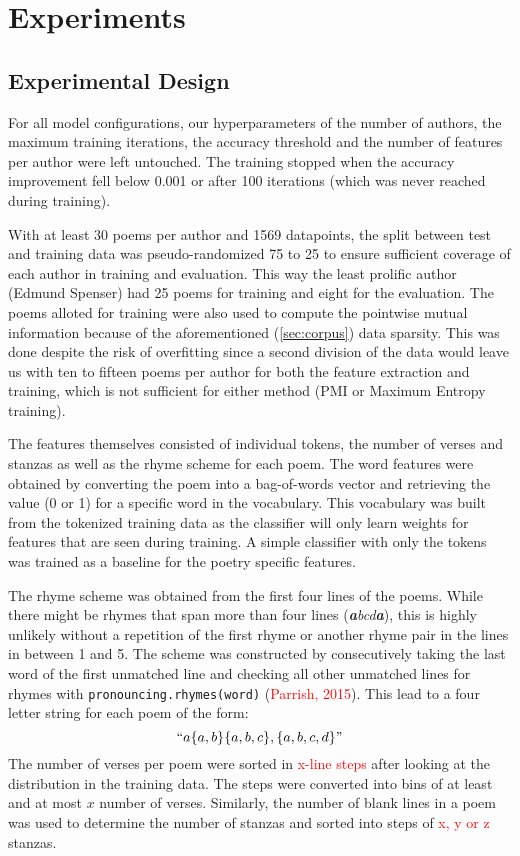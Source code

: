 \documentclass[11pt]{article}
\begin{document}
\label{sec:corpus}

\section{Experiments}

\subsection{Experimental Design}

For all model configurations, our hyperparameters of the number of authors, the maximum training 
iterations, the accuracy threshold and the number of features per author were left untouched. The training stopped when the accuracy
improvement fell below  0.001 or after 100 iterations (which was never reached during training).

With at least 30 poems per author and 1569 datapoints, the split between test and training data was 
pseudo-randomized 75 to 25 to ensure sufficient coverage of each author in training and evaluation.
This way the least prolific author (Edmund Spenser) had 25 poems for training and eight for 
the evaluation. The poems alloted for training were also used to compute the pointwise mutual information
because of the aforementioned (\ref{sec:corpus}) data sparsity. This was done despite the risk of 
overfitting since a second division of the data would leave us with ten to fifteen poems per author 
for both the feature extraction and training, which is not sufficient for either method (PMI or Maximum
Entropy training).

The features themselves consisted of individual tokens, the number of verses and stanzas as well as the
rhyme scheme for each poem. The word features were obtained by converting the poem into a bag-of-words 
vector and retrieving the value (0 or 1) for a specific word in the vocabulary. This vocabulary was built
from the tokenized training data as the classifier will only learn weights for features that are seen during
training. A simple classifier with only the tokens was trained as a baseline for the poetry specific features.

The rhyme scheme was obtained from the first four lines of the poems. While there might be rhymes that span more
than four lines (\textit{\textbf{a}bcd\textbf{a}}), this is highly unlikely without a repetition of the first 
rhyme or another rhyme pair in the lines in between 1 and 5. The scheme was constructed by consecutively taking 
the last word of the first unmatched line and checking all other unmatched lines for rhymes with 
\texttt{pronouncing.rhymes(word)} (\textcolor{red}{Parrish, 2015}). This lead to a four letter string for each poem of the form:
\[``a\{a,b\}\{a,b,c\},\{a,b,c,d\}"\]
The number of verses per poem were sorted in \textcolor{red}{x-line steps} after looking at the distribution
in the training data. The steps were converted into bins of  at least and at most $x$ number of verses. 
Similarly, the number of blank lines in a poem was used to determine the number of stanzas and sorted 
into steps of \textcolor{red}{x, y or z} stanzas. 
\end{document}
